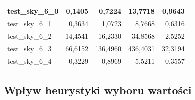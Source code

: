 \documentclass{article}
\begin{document}
\begin{table}[H]
\begin{center}
\begin{tabular}{|l|r|r|r|r|}
				test\_sky\_6\_0 & 0,1405                           & 0,7224                           & 13,7718                                & 0,9643                                 \\ \hline
				test\_sky\_6\_1 & 0,3634                           & 1,0723                           & 8,7668                                 & 0,6316                                 \\ \hline
				test\_sky\_6\_2 & 14,4541                          & 16,2330                          & 34,8568                                & 2,5252                                 \\ \hline
				test\_sky\_6\_3 & 66,6152                          & 136,4960                         & 436,4031                               & 32,3194                                \\ \hline
				test\_sky\_6\_4 & 0,3229                           & 0,8969                           & 5,5211                                 & 0,3557                                 \\ \hline
			\end{tabular}
		\end{center}
	\end{table}
	\subsection{Wpływ heurystyki wyboru wartości}
\end{document}
